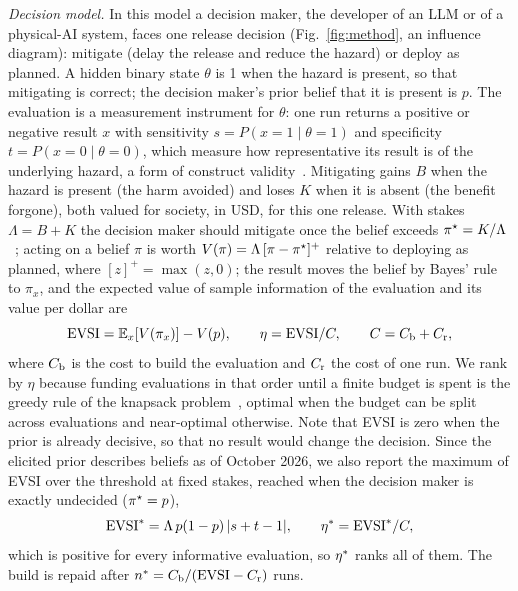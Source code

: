 \emph{Decision model.} In this model a decision maker, the developer of an LLM or of a physical-AI system, faces one release decision (Fig.~\ref{fig:method}, an influence diagram): mitigate (delay the release and reduce the hazard) or deploy as planned. A hidden binary state $\theta$ is 1 when the hazard is present, so that mitigating is correct; the decision maker's prior belief that it is present is $p$. The evaluation is a measurement instrument for $\theta$: one run returns a positive or negative result $x$ with sensitivity $s=P(x{=}1\mid\theta{=}1)$ and specificity $t=P(x{=}0\mid\theta{=}0)$, which measure how representative its result is of the underlying hazard, a form of construct validity~\citep{eriksson2025trust}. Mitigating gains $B$ when the hazard is present (the harm avoided) and loses $K$ when it is absent (the benefit forgone), both valued for society, in USD, for this one release. With stakes $\Lambda=B+K$ the decision maker should mitigate once the belief exceeds $\pi^\star=K/\Lambda$~\citep{pauker1980threshold}; acting on a belief $\pi$ is worth $V(\pi)=\Lambda\,[\pi-\pi^\star]^+$ relative to deploying as planned, where $[z]^+=\max(z,0)$; the result moves the belief by Bayes' rule to $\pi_x$, and the expected value of sample information of the evaluation and its value per dollar are
\begin{equation}
\mathrm{EVSI} = \mathbb{E}_x[V(\pi_x)]-V(p), \qquad \eta=\mathrm{EVSI}/C, \qquad C=C_\mathrm{b}+C_\mathrm{r},
\label{eq:evsi}
\end{equation}
where $C_\mathrm{b}$ is the cost to build the evaluation and $C_\mathrm{r}$ the cost of one run. We rank by $\eta$ because funding evaluations in that order until a finite budget is spent is the greedy rule of the knapsack problem~\citep{dantzig1957knapsack}, optimal when the budget can be split across evaluations and near-optimal otherwise. Note that EVSI is zero when the prior is already decisive, so that no result would change the decision. Since the elicited prior describes beliefs as of October 2026, we also report the maximum of EVSI over the threshold at fixed stakes, reached when the decision maker is exactly undecided ($\pi^\star=p$),
\begin{equation}
\mathrm{EVSI}^{*}=\Lambda\,p(1-p)\,|s+t-1|, \qquad \eta^{*}=\mathrm{EVSI}^{*}/C,
\label{eq:evsistar}
\end{equation}
which is positive for every informative evaluation, so $\eta^{*}$ ranks all of them. The build is repaid after $n^*=C_\mathrm{b}/(\mathrm{EVSI}-C_\mathrm{r})$ runs.

